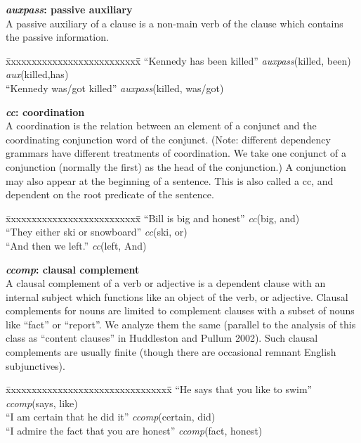 \documentclass[11pt,letterpaper]{article}
\begin{document}
\noindent \textbf{\emph{auxpass}: passive auxiliary}\\
A passive auxiliary of a clause is a non-main verb of the clause which contains the passive information.
\begin{tabbing}
\hspace{1cm} \= xxxxxxxxxxxxxxxxxxxxxxxxxx\= \hspace{.5cm}\=  \kill
\> ``Kennedy has been killed''  \> \> \emph{auxpass}(killed, been)\\
\> \> \> \emph{aux}(killed,has)\\
\> ``Kennedy was/got killed'' \> \> \emph{auxpass}(killed, was/got)\\
\end{tabbing}

\noindent\textbf{\emph{cc}: coordination}\\
A coordination is the relation between an element of a conjunct and the coordinating conjunction word of the conjunct.  (Note: different dependency grammars have different treatments of coordination.  We take one conjunct of a conjunction (normally the first) as the head of the conjunction.)
A conjunction may also appear at the beginning of a sentence.  This is also called a cc, and dependent on the root predicate of the sentence.
\begin{tabbing}
\hspace{1cm} \= xxxxxxxxxxxxxxxxxxxxxxxxxx\= \hspace{.5cm}\=  \kill
\>  ``Bill is big and honest'' \hspace{1cm} \> \> \emph{cc}(big, and)\\
\hspace{1cm} \> ``They either ski or snowboard'' \> \> \emph{cc}(ski, or)\\
\> ``And then we left.'' \> \> \emph{cc}(left, And)\\
\end{tabbing}

\noindent\textbf{\emph{ccomp}: clausal complement}\\
A clausal complement of a verb or adjective is a dependent clause with an internal subject which functions like an object of the verb, or adjective.  Clausal complements for nouns are limited to complement clauses with a subset of nouns
 like ``fact'' or ``report''.  We analyze them the same (parallel to the
 analysis of this class as ``content clauses'' in Huddleston and Pullum 2002). Such clausal complements are usually finite (though there are occasional remnant English subjunctives).
\begin{tabbing}
\hspace{1cm} \= xxxxxxxxxxxxxxxxxxxxxxxxxxxxxxxx\= \hspace{.5cm}\=  \kill
\>  ``He says that you like to swim'' \> \> \emph{ccomp}(says, like)\\
\hspace{1cm} \> ``I am certain that he did it'' \> \>  \emph{ccomp}(certain, did)\\
\hspace{1cm} \> ``I admire the fact that you are honest'' \>\> \emph{ccomp}(fact, honest)\\
\end{tabbing}
\end{document}
